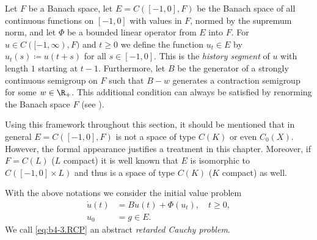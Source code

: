 Let $F$ be a Banach space, let $E = C([-1,0],F)$ be the Banach space of all continuous functions on $[-1,0]$ with values in $F$, normed by the supremum norm, and let $\Phi$ be a bounded linear operator from $E$ into $F$.
For $u \in C([-1,\infty),F)$ and $t \geq 0$ we define the function $u_{t} \in E$ by $u_{t}(s) \coloneq  u(t+s)$ for all $s \in [-1,0]$.
This is the \emph{history segment} of\/ $u$ with length $1$ starting at $t-1$.
Furthermore, let $B$ be the generator of a strongly continuous semigroup on $F$ such that $B - w$ generates a contraction semigroup for some $w \in \R_{+}$.
This additional condition can always be satisfied by renorming the Banach space $F$ (see \eg \textcite[Theorem~2.13]{goldstein:1985a}).

Using this framework throughout this section, it should be mentioned that in general $E = C([-1,0],F)$ is not a space of type $C(K)$ or even $C_{0}(X)$.
However, the formal appearance justifies a treatment in this chapter.
Moreover, if\/ $F = C(L)$ ($L$ compact) it is well known that $E$ is isomorphic to $C([-1,0] \times L)$ and thus is a space of type $C(K)$ ($K$ compact) as well.

With the above notations we consider the initial value problem
\begin{equation*}\label{eq:b4-3.RCP} \tag{RCP}
	\begin{split}
		\dot{u}(t) &= Bu(t) + \Phi(u_{t}), \quad t \geq 0, \\
		u_{0} &= g \in E.
	\end{split}
\end{equation*}
We call \eqref{eq:b4-3.RCP} an abstract \emph{retarded Cauchy problem}.

